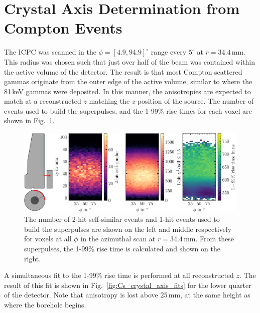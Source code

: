 \section{Crystal Axis Determination from Compton Events}\label{sec:crystal_axis_Cs}

The ICPC was scanned in the $\phi = [4.9, 94.9]^\circ$ range every $5^\circ$ at $r = 34.4$\,mm. This radius was chosen such that just over half of the \CsS{} beam was contained within the active volume of the detector. The result is that most Compton scattered gammas originate from the outer edge of the active volume, similar to where the 81\,keV \BaS{} gammas were deposited. In this manner, the anisotropies are expected to match at a reconstructed $z$ matching the $z$-position of the \BaS{} source. The number of events used to build the superpulses, and the 1-99\% rise times for each voxel are shown in Fig.~\ref{fig:Cs_crystal_axis}.
\begin{figure}[htb]
    \centering
    \includegraphics[width=6in]{figs/library/Cs_crystal_axis.png}
    \caption{The number of 2-hit self-similar events and 1-hit events used to build the superpulses are shown on the left and middle respectively for voxels at all $\phi$ in the azimuthal scan at $r = 34.4$\,mm. From these superpulses, the 1-99\% rise time is calculated and shown on the right.}
    \label{fig:Cs_crystal_axis}
\end{figure}
A simultaneous fit to the 1-99\% rise time is performed at all reconstructed $z$. The result of this fit is shown in Fig.~\ref{fig:Cs_crystal_axis_fits} for the lower quarter of the detector. Note that anisotropy is lost above 25\,mm, at the same height as where the borehole begins. 

